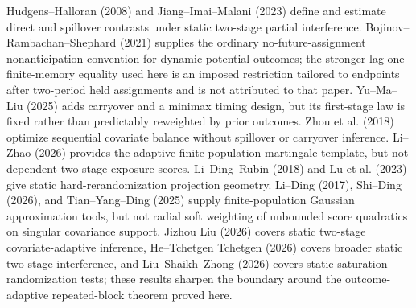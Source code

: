 Hudgens--Halloran (2008) and Jiang--Imai--Malani (2023) define and estimate direct and spillover contrasts under static two-stage partial interference.  Bojinov--Rambachan--Shephard (2021) supplies the ordinary no-future-assignment nonanticipation convention for dynamic potential outcomes; the stronger lag-one finite-memory equality used here is an imposed restriction tailored to endpoints after two-period held assignments and is not attributed to that paper.  Yu--Ma--Liu (2025) adds carryover and a minimax timing design, but its first-stage law is fixed rather than predictably reweighted by prior outcomes.  Zhou et al. (2018) optimize sequential covariate balance without spillover or carryover inference.  Li--Zhao (2026) provides the adaptive finite-population martingale template, but not dependent two-stage exposure scores.  Li--Ding--Rubin (2018) and Lu et al. (2023) give static hard-rerandomization projection geometry.  Li--Ding (2017), Shi--Ding (2026), and Tian--Yang--Ding (2025) supply finite-population Gaussian approximation tools, but not radial soft weighting of unbounded score quadratics on singular covariance support.  Jizhou Liu (2026) covers static two-stage covariate-adaptive inference, He--Tchetgen Tchetgen (2026) covers broader static two-stage interference, and Liu--Shaikh--Zhong (2026) covers static saturation randomization tests; these results sharpen the boundary around the outcome-adaptive repeated-block theorem proved here.